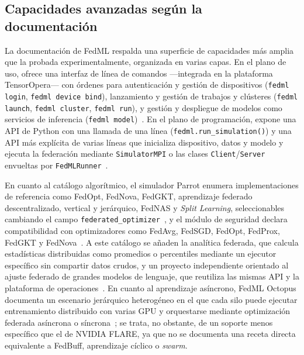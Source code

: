 \subsection{Capacidades avanzadas según la documentación}\label{subsec:flex-fedml-doc}

La documentación de FedML respalda una superficie de capacidades más amplia que la
probada experimentalmente, organizada en varias capas. En el plano de uso, ofrece una
interfaz de línea de comandos —integrada en la plataforma TensorOpera— con órdenes para
autenticación y gestión de dispositivos (\texttt{fedml login}, \texttt{fedml device
bind}), lanzamiento y gestión de trabajos y clústeres (\texttt{fedml launch},
\texttt{fedml cluster}, \texttt{fedml run}), y gestión y despliegue de modelos como
servicios de inferencia (\texttt{fedml model})~\parencite{fedmlExamples}. En el plano de
programación, expone una API de Python con una llamada de una línea
(\texttt{fedml.run\_simulation()}) y una API más explícita de varias líneas que
inicializa dispositivo, datos y modelo y ejecuta la federación mediante
\texttt{SimulatorMPI} o las clases \texttt{Client}/\texttt{Server} envueltas por
\texttt{FedMLRunner}~\parencite{fedmlSimApi}.

En cuanto al catálogo algorítmico, el simulador Parrot enumera implementaciones de
referencia como FedOpt, FedNova, FedGKT, aprendizaje federado descentralizado, vertical
y jerárquico, FedNAS y \textit{Split Learning}, seleccionables cambiando el campo
\texttt{federated\_optimizer}~\parencite{fedmlSimOverview,fedmlSimApi}, y el módulo de
seguridad declara compatibilidad con optimizadores como FedAvg, FedSGD, FedOpt, FedProx,
FedGKT y FedNova~\parencite{fedmlSecurity}. A este catálogo se añaden la analítica
federada, que calcula estadísticas distribuidas como promedios o percentiles mediante un
ejecutor específico sin compartir datos crudos, y un proyecto independiente orientado al
ajuste federado de grandes modelos de lenguaje, que reutiliza las mismas API y la
plataforma de operaciones~\parencite{fedmlExamples}. En cuanto al aprendizaje asíncrono,
FedML Octopus documenta un escenario jerárquico heterogéneo en el que cada silo puede
ejecutar entrenamiento distribuido con varias GPU y orquestarse mediante optimización
federada asíncrona o síncrona~\parencite{fedmlCrossSilo}; se trata, no obstante, de un
soporte menos específico que el de NVIDIA FLARE, ya que no se documenta una receta directa
equivalente a FedBuff, aprendizaje cíclico o \textit{swarm}.

